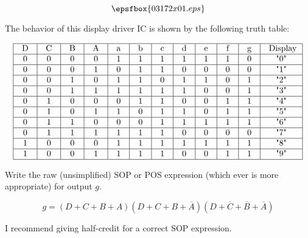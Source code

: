 

$$\epsfbox{03172x01.eps}$$

The behavior of this display driver IC is shown by the following truth table:


$$\vbox{\offinterlineskip
\halign{\strut
\vrule \quad\hfil # \ \hfil & 
\vrule \quad\hfil # \ \hfil & 
\vrule \quad\hfil # \ \hfil & 
\vrule \quad\hfil # \ \hfil & 
\vrule \quad\hfil # \ \hfil & 
\vrule \quad\hfil # \ \hfil & 
\vrule \quad\hfil # \ \hfil & 
\vrule \quad\hfil # \ \hfil & 
\vrule \quad\hfil # \ \hfil & 
\vrule \quad\hfil # \ \hfil & 
\vrule \quad\hfil # \ \hfil & 
\vrule \quad\hfil # \ \hfil \vrule \cr
\noalign{\hrule}
%
D & C & B & A & a & b & c & d & e & f & g & Display\cr
%
\noalign{\hrule}
%
0 & 0 & 0 & 0 & 1 & 1 & 1 & 1 & 1 & 1 & 0 & "0" \cr
%
\noalign{\hrule}
%
0 & 0 & 0 & 1 & 0 & 1 & 1 & 0 & 0 & 0 & 0 & "1" \cr
%
\noalign{\hrule}
%
0 & 0 & 1 & 0 & 1 & 1 & 0 & 1 & 1 & 0 & 1 & "2" \cr
%
\noalign{\hrule}
%
0 & 0 & 1 & 1 & 1 & 1 & 1 & 1 & 0 & 0 & 1 & "3" \cr
%
\noalign{\hrule}
%
0 & 1 & 0 & 0 & 0 & 1 & 1 & 0 & 0 & 1 & 1 & "4" \cr
%
\noalign{\hrule}
%
0 & 1 & 0 & 1 & 1 & 0 & 1 & 1 & 0 & 1 & 1 & "5" \cr
%
\noalign{\hrule}
%
0 & 1 & 1 & 0 & 0 & 0 & 1 & 1 & 1 & 1 & 1 & "6" \cr
%
\noalign{\hrule}
%
0 & 1 & 1 & 1 & 1 & 1 & 1 & 0 & 0 & 0 & 0 & "7" \cr
%
\noalign{\hrule}
%
1 & 0 & 0 & 0 & 1 & 1 & 1 & 1 & 1 & 1 & 1 & "8" \cr
%
\noalign{\hrule}
%
1 & 0 & 0 & 1 & 1 & 1 & 1 & 0 & 0 & 1 & 1 & "9" \cr
%
\noalign{\hrule}
} %
}$$ %

Write the raw (unsimplified) SOP or POS expression (which ever is more appropriate) for output $g$.







$$g = (D + C + B + A)(D + C + B + \overline{A})(D + \overline{C} + \overline{B} + \overline{A})$$

I recommend giving half-credit for a correct SOP expression.

